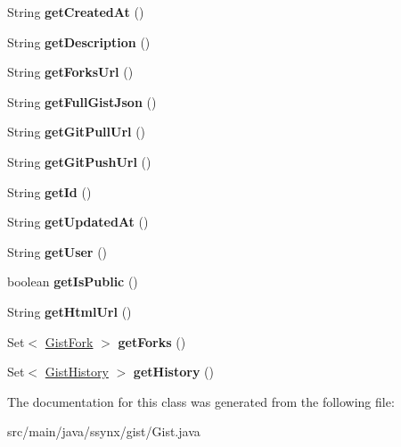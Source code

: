 \begin{DoxyCompactItemize}
\mbox{\label{classssynx_1_1gist_1_1Gist_a48660c6ecfd28b582af178fdca5a042a}} 
String {\bfseries get\+Created\+At} ()
\item 
\mbox{\label{classssynx_1_1gist_1_1Gist_aed1fbd168b50ca53b36fadabea2392b9}} 
String {\bfseries get\+Description} ()
\item 
\mbox{\label{classssynx_1_1gist_1_1Gist_af090030cd3a0707c3652fdc1fe857feb}} 
String {\bfseries get\+Forks\+Url} ()
\item 
\mbox{\label{classssynx_1_1gist_1_1Gist_ab8e4704bed8c5845f95778012a4d04b5}} 
String {\bfseries get\+Full\+Gist\+Json} ()
\item 
\mbox{\label{classssynx_1_1gist_1_1Gist_af6adec4c97a07371a3669035b3a7611b}} 
String {\bfseries get\+Git\+Pull\+Url} ()
\item 
\mbox{\label{classssynx_1_1gist_1_1Gist_aa2ad19a567b508f82ba64522fb7f37d9}} 
String {\bfseries get\+Git\+Push\+Url} ()
\item 
\mbox{\label{classssynx_1_1gist_1_1Gist_a267c9d43eddd86f9284a5e6b5ad0709c}} 
String {\bfseries get\+Id} ()
\item 
\mbox{\label{classssynx_1_1gist_1_1Gist_ad9571fae8ed86e15abbb0738124a5ad8}} 
String {\bfseries get\+Updated\+At} ()
\item 
\mbox{\label{classssynx_1_1gist_1_1Gist_aeaddb725bccd27cdbee28f2683b7f8cc}} 
String {\bfseries get\+User} ()
\item 
\mbox{\label{classssynx_1_1gist_1_1Gist_a4a36874468d433107252a5f51ca126b7}} 
boolean {\bfseries get\+Is\+Public} ()
\item 
\mbox{\label{classssynx_1_1gist_1_1Gist_a2c158d87761124965b4ee3a96b65196c}} 
String {\bfseries get\+Html\+Url} ()
\item 
\mbox{\label{classssynx_1_1gist_1_1Gist_a56ff5b2360953a7d5aee78e344abbd5b}} 
Set$<$ \hyperlink{classssynx_1_1gist_1_1GistFork}{Gist\+Fork} $>$ {\bfseries get\+Forks} ()
\item 
\mbox{\label{classssynx_1_1gist_1_1Gist_ab2cc138e0b8d29c071fb1baef5cc14cd}} 
Set$<$ \hyperlink{classssynx_1_1gist_1_1GistHistory}{Gist\+History} $>$ {\bfseries get\+History} ()
\end{DoxyCompactItemize}


The documentation for this class was generated from the following file\+:\begin{DoxyCompactItemize}
\item 
src/main/java/ssynx/gist/Gist.\+java\end{DoxyCompactItemize}
